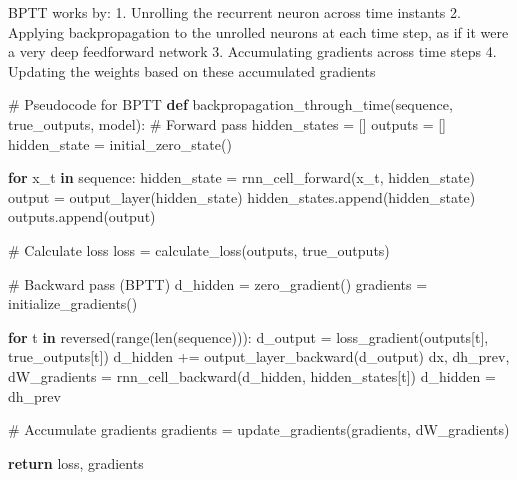 \documentclass[
  letterpaper,
  DIV=11,
  numbers=noendperiod]{scrreprt}
\newenvironment{Shaded}{\begin{snugshade}}{\end{snugshade}}
\newcommand{\BuiltInTok}[1]{\textcolor[rgb]{0.00,0.23,0.31}{#1}}
\newcommand{\CommentTok}[1]{\textcolor[rgb]{0.37,0.37,0.37}{#1}}
\newcommand{\ControlFlowTok}[1]{\textcolor[rgb]{0.00,0.23,0.31}{\textbf{#1}}}
\newcommand{\KeywordTok}[1]{\textcolor[rgb]{0.00,0.23,0.31}{\textbf{#1}}}
\newcommand{\NormalTok}[1]{\textcolor[rgb]{0.00,0.23,0.31}{#1}}
\newcommand{\OperatorTok}[1]{\textcolor[rgb]{0.37,0.37,0.37}{#1}}
\begin{document}
BPTT works by: 1. Unrolling the recurrent neuron across time instants 2.
Applying backpropagation to the unrolled neurons at each time step, as
if it were a very deep feedforward network 3. Accumulating gradients
across time steps 4. Updating the weights based on these accumulated
gradients

\begin{Shaded}
\begin{Highlighting}[]
\CommentTok{\# Pseudocode for BPTT}
\KeywordTok{def}\NormalTok{ backpropagation\_through\_time(sequence, true\_outputs, model):}
    \CommentTok{\# Forward pass}
\NormalTok{    hidden\_states }\OperatorTok{=}\NormalTok{ []}
\NormalTok{    outputs }\OperatorTok{=}\NormalTok{ []}
\NormalTok{    hidden\_state }\OperatorTok{=}\NormalTok{ initial\_zero\_state()}
    
    \ControlFlowTok{for}\NormalTok{ x\_t }\KeywordTok{in}\NormalTok{ sequence:}
\NormalTok{        hidden\_state }\OperatorTok{=}\NormalTok{ rnn\_cell\_forward(x\_t, hidden\_state)}
\NormalTok{        output }\OperatorTok{=}\NormalTok{ output\_layer(hidden\_state)}
\NormalTok{        hidden\_states.append(hidden\_state)}
\NormalTok{        outputs.append(output)}
    
    \CommentTok{\# Calculate loss}
\NormalTok{    loss }\OperatorTok{=}\NormalTok{ calculate\_loss(outputs, true\_outputs)}
    
    \CommentTok{\# Backward pass (BPTT)}
\NormalTok{    d\_hidden }\OperatorTok{=}\NormalTok{ zero\_gradient()}
\NormalTok{    gradients }\OperatorTok{=}\NormalTok{ initialize\_gradients()}
    
    \ControlFlowTok{for}\NormalTok{ t }\KeywordTok{in} \BuiltInTok{reversed}\NormalTok{(}\BuiltInTok{range}\NormalTok{(}\BuiltInTok{len}\NormalTok{(sequence))):}
\NormalTok{        d\_output }\OperatorTok{=}\NormalTok{ loss\_gradient(outputs[t], true\_outputs[t])}
\NormalTok{        d\_hidden }\OperatorTok{+=}\NormalTok{ output\_layer\_backward(d\_output)}
\NormalTok{        dx, dh\_prev, dW\_gradients }\OperatorTok{=}\NormalTok{ rnn\_cell\_backward(d\_hidden, hidden\_states[t])}
\NormalTok{        d\_hidden }\OperatorTok{=}\NormalTok{ dh\_prev}
        
        \CommentTok{\# Accumulate gradients}
\NormalTok{        gradients }\OperatorTok{=}\NormalTok{ update\_gradients(gradients, dW\_gradients)}
    
    \ControlFlowTok{return}\NormalTok{ loss, gradients}
\end{Highlighting}
\end{Shaded}
\end{document}
